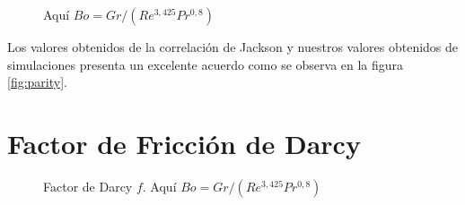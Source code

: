 \begin{figure}[H]
  \centering
    
  \caption{Aquí $Bo = Gr / (Re^{3,425} Pr^{0,8})$}
  \label{fig:nusselt}
\end{figure}

Los valores obtenidos de la correlación de Jackson y nuestros valores obtenidos de simulaciones presenta un excelente acuerdo como se observa en la figura \ref{fig:parity}. 

\newpage
\section{Factor de Fricción de Darcy}

\begin{figure}[H]
  \centering
  \caption{Factor de Darcy $ f$. Aquí $Bo = Gr / (Re^{3,425} Pr^{0,8})$}
  \label{fig:darcy_vs_bo}
\end{figure}



